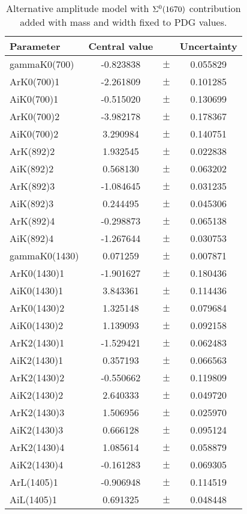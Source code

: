 \clearpage

\begin{table}
\centering
\caption{Alternative amplitude model with ${{\Sigma}{}^0}(1670)$ contribution added with mass and width fixed to PDG values.}
\begin{tiny}
\begin{tabular}{lccc}
\toprule
Parameter & Central value & & Uncertainty\\
\midrule 
gammaK0(700) & -0.823838 & $\pm$ & 0.055829 \\
ArK0(700)1 & -2.261809 & $\pm$ & 0.101285 \\
AiK0(700)1 & -0.515020 & $\pm$ & 0.130699 \\
ArK0(700)2 & -3.982178 & $\pm$ & 0.178367 \\
AiK0(700)2 & 3.290984 & $\pm$ & 0.140751 \\
ArK(892)2 & 1.932545 & $\pm$ & 0.022838 \\
AiK(892)2 & 0.568130 & $\pm$ & 0.063202 \\
ArK(892)3 & -1.084645 & $\pm$ & 0.031235 \\
AiK(892)3 & 0.244495 & $\pm$ & 0.045306 \\
ArK(892)4 & -0.298873 & $\pm$ & 0.065138 \\
AiK(892)4 & -1.267644 & $\pm$ & 0.030753 \\
gammaK0(1430) & 0.071259 & $\pm$ & 0.007871 \\
ArK0(1430)1 & -1.901627 & $\pm$ & 0.180436 \\
AiK0(1430)1 & 3.843361 & $\pm$ & 0.114436 \\
ArK0(1430)2 & 1.325148 & $\pm$ & 0.079684 \\
AiK0(1430)2 & 1.139093 & $\pm$ & 0.092158 \\
ArK2(1430)1 & -1.529421 & $\pm$ & 0.062483 \\
AiK2(1430)1 & 0.357193 & $\pm$ & 0.066563 \\
ArK2(1430)2 & -0.550662 & $\pm$ & 0.119809 \\
AiK2(1430)2 & 2.640333 & $\pm$ & 0.049720 \\
ArK2(1430)3 & 1.506956 & $\pm$ & 0.025970 \\
AiK2(1430)3 & 0.666128 & $\pm$ & 0.095124 \\
ArK2(1430)4 & 1.085614 & $\pm$ & 0.058879 \\
AiK2(1430)4 & -0.161283 & $\pm$ & 0.069305 \\
ArL(1405)1 & -0.906948 & $\pm$ & 0.114519 \\
AiL(1405)1 & 0.691325 & $\pm$ & 0.048448 \\

\end{tabular}
\end{tiny}
\end{table}
